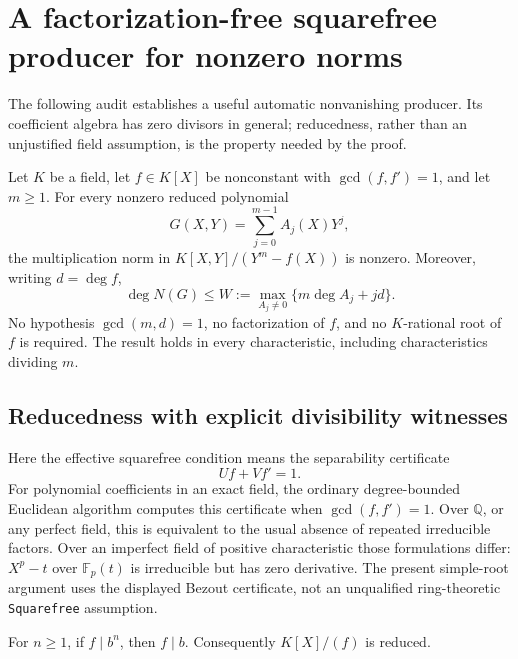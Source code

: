 \section{A factorization-free squarefree producer for nonzero norms}
\label{sec:squarefree-norm-audit}

The following audit establishes a useful automatic nonvanishing producer.
Its coefficient algebra has zero divisors in general; reducedness, rather
than an unjustified field assumption, is the property needed by the proof.

\begin{theorem}
\label{thm:squarefree-norm-producer}
Let \(K\) be a field, let \(f\in K[X]\) be nonconstant with
\(\gcd(f,f')=1\),
and let \(m\geq1\).  For every nonzero reduced polynomial
\[
 G(X,Y)=\sum_{j=0}^{m-1}A_j(X)Y^j,
\]
the multiplication norm in \(K[X,Y]/(Y^m-f(X))\) is nonzero.  Moreover,
writing \(d=\deg f\),
\[
 \deg N(G)\leq
 W:=\max_{A_j\ne0}\{m\deg A_j+jd\}.
\]
No hypothesis \(\gcd(m,d)=1\), no factorization of \(f\), and no
\(K\)-rational root of \(f\) is required.  The result holds in every
characteristic, including characteristics dividing \(m\).
\end{theorem}

\subsection{Reducedness with explicit divisibility witnesses}

Here the effective squarefree condition means the separability certificate
\begin{equation}
 \label{eq:squarefree-bezout}
       U f+V f'=1.
\end{equation}
For polynomial coefficients in an exact field, the ordinary degree-bounded
Euclidean algorithm computes this certificate when \(\gcd(f,f')=1\).
Over \(\mathbb Q\), or any perfect field, this is equivalent to the usual
absence of repeated irreducible factors.  Over an imperfect field of
positive characteristic those formulations differ: \(X^p-t\) over
\(\mathbb F_p(t)\) is irreducible but has zero derivative.  The present
simple-root argument uses the displayed Bezout certificate, not an
unqualified ring-theoretic \texttt{Squarefree} assumption.

\begin{lemma}
\label{lem:quotient-reduced-explicit}
For \(n\geq1\), if \(f\mid b^n\), then \(f\mid b\).
Consequently \(K[X]/(f)\) is reduced.
\end{lemma}

